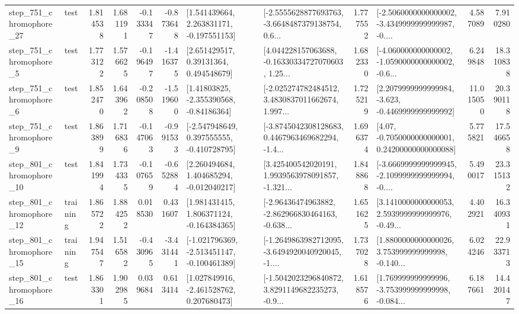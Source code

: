 \begin{tabular}{llrrrrllrlrr}
  step\_751\_chromophore\_27 &      test &      1.814538 &    1.681191 &     -0.133347 & -0.873648 &    [1.541439664, 2.263831171, -0.197551153] &  [-2.5555628877693763, -3.6648487379138754, 0.6... &       1.777552 &  [-2.5060000000000002, -3.4349999999999987, -0.... &            4.587089 &          7.910280 \\
   step\_751\_chromophore\_5 &      test &      1.773122 &    1.576625 &     -0.196497 & -1.416375 &      [2.651429517, 0.39131364, 0.494548679] &  [4.044228157063688, -0.16330334727070603, 1.25... &       1.682330 &  [-4.060000000000002, -1.0590000000000002, -0.6... &            6.249848 &         18.310838 \\
   step\_751\_chromophore\_6 &      test &      1.852470 &    1.643962 &     -0.208508 & -1.519600 &     [1.41803825, -2.355390568, -0.84186364] &  [-2.025274782484512, 3.4830837011662674, 1.997... &       1.725219 &  [2.2079999999999984, -3.623, -0.4469999999999992] &           11.015050 &         20.390118 \\
   step\_751\_chromophore\_9 &      test &      1.863899 &    1.716836 &     -0.147063 & -0.991533 &   [-2.547948649, 0.397555555, -0.410728795] &  [-3.8745042308128683, 0.4467963469682294, -1.4... &       1.696374 &   [4.07, -0.7050000000000001, 0.24200000000000088] &            5.775821 &         17.546658 \\
  step\_801\_chromophore\_10 &      test &      1.841994 &    1.734335 &     -0.107659 & -0.652884 &    [2.260494684, 1.404685294, -0.012040217] &  [3.425400542020191, 1.9939563978091857, -1.321... &       1.848868 &  [-3.6669999999999945, -2.1099999999999994, -0.... &            5.490017 &         23.315132 \\
  step\_801\_chromophore\_12 &  training &      1.865722 &    1.884252 &      0.018530 &  0.431607 &    [1.981431415, 1.806371124, -0.164384365] &  [-2.96436474963882, -2.862966830464163, -0.638... &       1.651625 &  [3.1410000000000053, 2.5939999999999976, -0.49... &            4.402921 &         16.340931 \\
  step\_801\_chromophore\_15 &  training &      1.947547 &    1.516582 &     -0.430965 & -3.431441 &  [-1.021796369, -2.513451147, -0.100461389] &  [-1.2649863982712095, -3.6494920040920045, -1.... &       1.737028 &  [1.8800000000000026, 3.753999999999998, -0.140... &            6.024246 &         22.933713 \\
  step\_801\_chromophore\_16 &      test &      1.863301 &    1.902985 &      0.039684 &  0.613414 &    [1.027849916, -2.461528762, 0.207680473] &  [-1.5042023296840872, 3.8291149682235273, -0.9... &       1.618576 &  [1.769999999999996, -3.753999999999998, -0.084... &            6.187661 &         14.420147 \\

\end{tabular}
